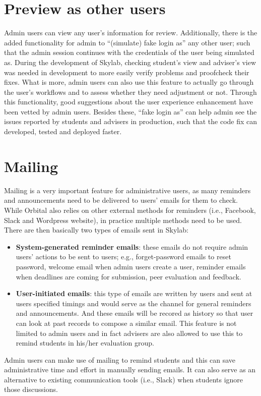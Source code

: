 \section{Preview as other users} \label{adminpreviewas}

Admin users can view any user's information for review.  Additionally, there is the added functionality for admin to ``(simulate) fake login as'' any other user; such that the admin session continues with the credentials of the user being simulated as. During the development of Skylab, checking student's view and adviser's view was needed in development to more easily verify problems and proofcheck their fixes.  What is more, admin users can also use this feature to actually go through the user's workflows and to assess whether they need adjustment or not.  Through this functionality, good suggestions about the user experience enhancement have been vetted by admin users. Besides these, ``fake login as'' can help admin see the issues reported by students and advisers in production, such that the code fix can developed, tested and deployed faster.

\section{Mailing} \label{adminmailing}

Mailing is a very important feature for administrative users, as many reminders and announcements need to be delivered to users' emails for them to check.  While Orbital also relies on other external methods for reminders (i.e., Facebook, Slack and Wordpress website), in practice multiple methods need to be used.  There are then basically two types of emails sent in Skylab:

\begin{itemize}
  \item {\bf System-generated reminder emails}: these emails do not require admin users' actions to be sent to users; e.g., forget-password emails to reset password, welcome email when admin users create a user, reminder emails when deadlines are coming for submission, peer evaluation and feedback.
  \item {\bf User-initiated emails}: this type of emails are written by users and sent at users specified timings and would serve as the channel for general reminders and announcements. And these emails will be recored as history so that user can look at past records to compose a similar email. This feature is not limited to admin users and in fact advisers are also allowed to use this to remind students in his/her evaluation group.
\end{itemize}

Admin users can make use of mailing to remind students and this can save administrative time and effort in manually sending emails. It can also serve as an alternative to existing communication tools (i.e., Slack) when students ignore those discussions.

